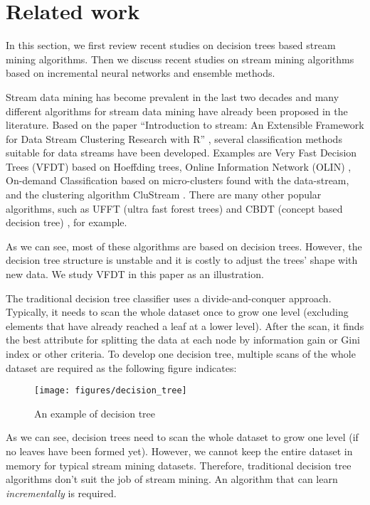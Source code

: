 \documentclass[conference]{IEEEtran}
\begin{document}
		\section{Related work}
		\label{sec:related-work}
		In this section, we first review recent studies on decision trees based stream mining algorithms. Then we discuss recent studies on stream mining algorithms based on incremental neural networks and ensemble methods. 
		
		Stream data mining has become prevalent in the last two decades and many different algorithms for stream data mining have already been proposed in the literature. Based on the paper ``Introduction to stream: An Extensible Framework for Data Stream Clustering Research with R'' \cite{Rstream}, several classification methods suitable for data streams have been developed. Examples are Very Fast Decision Trees (VFDT) \cite{VFDT} based on Hoeffding trees, Online Information Network (OLIN)  \cite{last}, On-demand Classification \cite{Aggarwal04} based on micro-clusters found with the data-stream, and the clustering algorithm CluStream \cite{ggarwal03}. There are many other popular algorithms, such as UFFT (ultra fast forest trees) \cite{gama} and CBDT (concept based decision tree) \cite{CBDT}, for example. 
		
		As we can see, most of these algorithms are based on decision trees. However, the decision tree structure is unstable and it is costly to adjust the trees' shape with new data. We study VFDT in this paper as an illustration.
		
		The traditional decision tree classifier uses a divide-and-conquer approach. Typically, it needs to scan the whole dataset once to grow one level (excluding elements that have already reached a leaf at a lower level). After the scan, it finds the best attribute for splitting the data at each node by information gain or Gini index or other criteria. To develop one decision tree, multiple scans of the whole dataset are required as the following figure indicates:
		\begin{figure}[H]
			\centering
			\texttt{[image: figures/decision\_tree]}
			\caption{An example of decision tree}
			\label{fig:tree}
		\end{figure}
		
		As we can see, decision trees need to scan the whole dataset to grow one level (if no leaves have been formed yet). However, we cannot keep the entire dataset in memory for typical stream mining datasets. Therefore, traditional decision tree algorithms don't suit the job of stream mining. An algorithm that can learn \emph{incrementally} is required.
		
\end{document}
